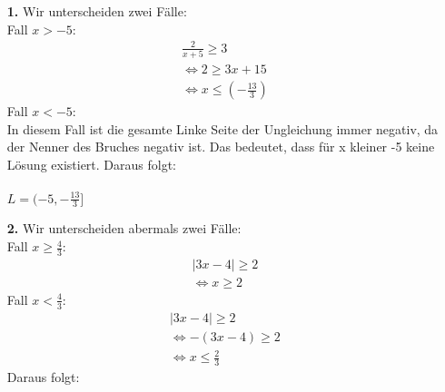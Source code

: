 \documentclass [a4paper,11pt]{article}
\author{\authorinfotitle}
\title{\titleinfo}
\date{\today}
\begin{document}
\maketitle
    \begin{enumerate}
        \item[\textbf{1.}]
            Wir unterscheiden zwei Fälle: \\
            Fall $x > -5$:\\
            \begin{align}
                \frac{2}{x+5} \geq 3 \\
                \Leftrightarrow 2 \geq 3x+15 \\
                \Leftrightarrow x \leq (- \frac{13}{3})
            \end{align}
            Fall $x < -5$:\\
                In diesem Fall ist die gesamte Linke Seite der Ungleichung immer negativ, da der Nenner des Bruches negativ ist. Das bedeutet, dass für x kleiner -5 keine Lösung existiert.
            Daraus folgt: \\ \\
            $L = (- 5, - \frac{13}{3}]$
        \item[\textbf{2.}]
            Wir unterscheiden abermals zwei Fälle: \\
            Fall $x \geq \frac{4}{3}$: \\
            \begin{align}
                |3x-4| \geq 2 \\
                \Leftrightarrow x \geq 2
            \end{align}
            Fall $x < \frac{4}{3}$: \\
            \begin{align}
                |3x-4| \geq 2 \\
                \Leftrightarrow -(3x-4) \geq 2 \\
                \Leftrightarrow x \leq \frac{2}{3}
            \end{align}
            Daraus folgt: \\ \\

\end{enumerate}
\end{document}
